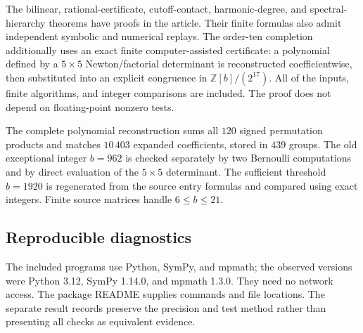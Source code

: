 \documentclass[11pt]{article}
\theoremstyle{definition}
\theoremstyle{remark}
\numberwithin{equation}{section}
\newcommand{\Z}{\mathbb Z}
\begin{document}
The bilinear, rational-certificate, cutoff-contact, harmonic-degree,
and spectral-hierarchy theorems have proofs in the article. Their
finite formulas also admit independent symbolic and numerical
replays. The order-ten completion additionally uses an exact finite
computer-assisted certificate: a polynomial defined by a $5\times5$
Newton/factorial determinant is reconstructed coefficientwise, then
substituted into an explicit congruence in $\Z[b]/(2^{17})$.
All of the inputs, finite algorithms, and integer comparisons are
included. The proof does not depend on floating-point nonzero tests.

The complete polynomial reconstruction sums all $120$ signed
permutation products and matches $10\,403$ expanded coefficients,
stored in $439$ groups. The old exceptional integer $b=962$ is
checked separately by two Bernoulli computations and by direct
evaluation of the $5\times5$ determinant. The sufficient threshold
$b=1920$ is regenerated from the source entry formulas and compared
using exact integers. Finite source matrices handle $6\le b\le21$.

\subsection{Reproducible diagnostics}

The included programs use Python, SymPy, and mpmath; the observed
versions were Python 3.12, SymPy 1.14.0, and mpmath 1.3.0. They need
no network access. The package README supplies commands and file
locations. The separate result records preserve the precision and
test method rather than presenting all checks as equivalent evidence.
\end{document}

